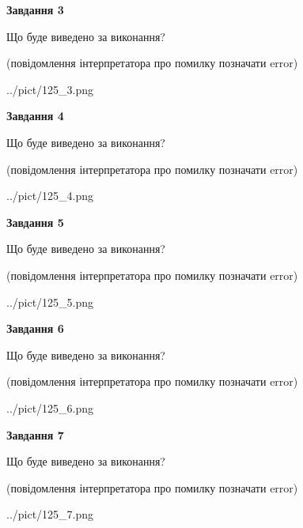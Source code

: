 \documentclass[12pt, ukrainian]{article}
\begin{document}
{\begin {large}
{\begin {center}\textbf{Завдання 3}\end {center}}\par
Що буде виведено за виконання?\par
 (повідомлення інтерпретатора про помилку позначати error)\par
\begin{center}
	{../pict/125_3.png}
\end{center}
\newpage

{\begin {center}\textbf{Завдання 4}\end {center}}\par
Що буде виведено за виконання?\par
 (повідомлення інтерпретатора про помилку позначати error)\par
\begin{center}
	{../pict/125_4.png}
\end{center}
\newpage

{\begin {center}\textbf{Завдання 5}\end {center}}\par
Що буде виведено за виконання?\par
 (повідомлення інтерпретатора про помилку позначати error)\par
\begin{center}
	{../pict/125_5.png}
\end{center}
\newpage

{\begin {center}\textbf{Завдання 6}\end {center}}\par
Що буде виведено за виконання?\par
 (повідомлення інтерпретатора про помилку позначати error)\par
\begin{center}
	{../pict/125_6.png}
\end{center}
\newpage

{\begin {center}\textbf{Завдання 7}\end {center}}\par
Що буде виведено за виконання?\par
 (повідомлення інтерпретатора про помилку позначати error)\par
\begin{center}
	{../pict/125_7.png}
\end{center}
\newpage


\end{large}}
\end{document}
